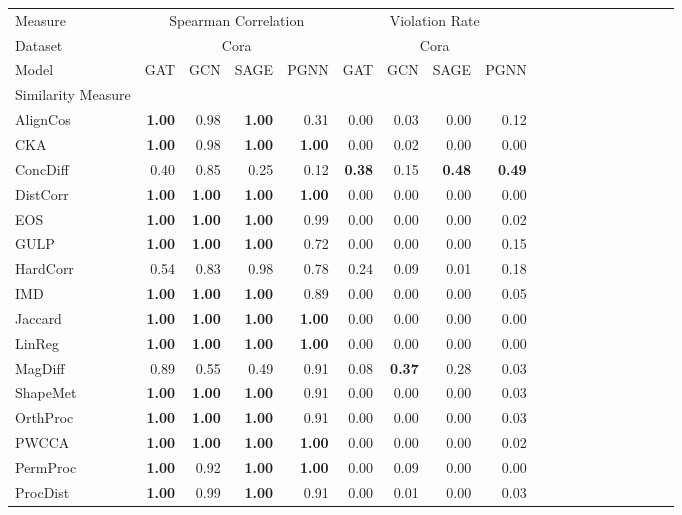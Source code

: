 \begin{tabular}{l||rrr|rrr|rrr||rrr|rrr|rrr}
\toprule
Measure & \multicolumn{4}{c}{Spearman Correlation} & \multicolumn{4}{c}{Violation Rate} \\
Dataset & \multicolumn{4}{c}{Cora} & \multicolumn{4}{c}{Cora} \\
Model & GAT & GCN & SAGE & PGNN & GAT & GCN & SAGE & PGNN \\
Similarity Measure &  &  &  &  &  &  &  &  \\
\midrule
AlignCos & \textbf{1.00} & 0.98 & \textbf{1.00} & 0.31 & 0.00 & 0.03 & 0.00 & 0.12 \\
CKA & \textbf{1.00} & 0.98 & \textbf{1.00} & \textbf{1.00} & 0.00 & 0.02 & 0.00 & 0.00 \\
ConcDiff & 0.40 & 0.85 & 0.25 & 0.12 & \textbf{0.38} & 0.15 & \textbf{0.48} & \textbf{0.49} \\
DistCorr & \textbf{1.00} & \textbf{1.00} & \textbf{1.00} & \textbf{1.00} & 0.00 & 0.00 & 0.00 & 0.00 \\
EOS & \textbf{1.00} & \textbf{1.00} & \textbf{1.00} & 0.99 & 0.00 & 0.00 & 0.00 & 0.02 \\
GULP & \textbf{1.00} & \textbf{1.00} & \textbf{1.00} & 0.72 & 0.00 & 0.00 & 0.00 & 0.15 \\
HardCorr & 0.54 & 0.83 & 0.98 & 0.78 & 0.24 & 0.09 & 0.01 & 0.18 \\
IMD & \textbf{1.00} & \textbf{1.00} & \textbf{1.00} & 0.89 & 0.00 & 0.00 & 0.00 & 0.05 \\
Jaccard & \textbf{1.00} & \textbf{1.00} & \textbf{1.00} & \textbf{1.00} & 0.00 & 0.00 & 0.00 & 0.00 \\
LinReg & \textbf{1.00} & \textbf{1.00} & \textbf{1.00} & \textbf{1.00} & 0.00 & 0.00 & 0.00 & 0.00 \\
MagDiff & 0.89 & 0.55 & 0.49 & 0.91 & 0.08 & \textbf{0.37} & 0.28 & 0.03 \\
ShapeMet & \textbf{1.00} & \textbf{1.00} & \textbf{1.00} & 0.91 & 0.00 & 0.00 & 0.00 & 0.03 \\
OrthProc & \textbf{1.00} & \textbf{1.00} & \textbf{1.00} & 0.91 & 0.00 & 0.00 & 0.00 & 0.03 \\
PWCCA & \textbf{1.00} & \textbf{1.00} & \textbf{1.00} & \textbf{1.00} & 0.00 & 0.00 & 0.00 & 0.02 \\
PermProc & \textbf{1.00} & 0.92 & \textbf{1.00} & \textbf{1.00} & 0.00 & 0.09 & 0.00 & 0.00 \\
ProcDist & \textbf{1.00} & 0.99 & \textbf{1.00} & 0.91 & 0.00 & 0.01 & 0.00 & 0.03 \\

\end{tabular}
